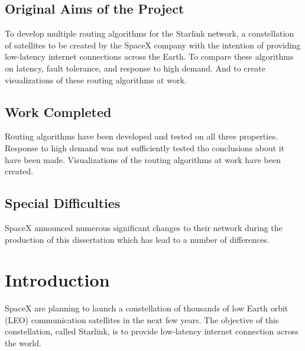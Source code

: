 \documentclass[12pt,a4paper,twoside,openright]{report}
\begin{document}
\section*{Original Aims of the Project}

To develop multiple routing algorithms for the Starlink network, a constellation of satellites to be created by the SpaceX company with the intention of providing low-latency internet connections across the Earth. To compare these algorithms on latency, fault tolerance, and response to high demand. And to create visualizations of these routing algorithms at work.

\section*{Work Completed}

Routing algorithms have been developed and tested on all three properties. Response to high demand was not sufficiently tested tho conclusions about it have been made. Visualizations of the routing algorithms at work have been created.

\section*{Special Difficulties}

SpaceX announced numerous significant changes to their network during the production of this dissertation which has lead to a number of differences.


\tableofcontents

\listoffigures

\chapter{Introduction}

SpaceX are planning to launch a constellation of thousands of low Earth orbit (LEO) communication satellites in the next few years. The objective of this constellation, called Starlink, is to provide low-latency internet connection across the world.
\end{document}
